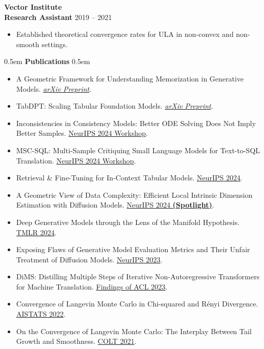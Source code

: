 \documentclass[11pt,a4paper]{article}
\newcommand{\cvsection}[1]{%
    \vspace{10pt}
    \noindent\hfill\kern0.5em
    {\Huge \textbf{\textcolor{maincolor}{#1}}}%
    \kern0.5em\hfill\vspace{8pt}
}
\begin{document}
{\Large \textbf{\textcolor{maincolor}{Vector Institute}}} \\
\textbf{Research Assistant} \hfill 2019 -- 2021
\begin{itemize}[noitemsep, topsep=4pt, leftmargin=1.5em, label=\textcolor{maincolorlight}{$\circ$}]
    \item Established theoretical convergence rates for ULA in non-convex and non-smooth settings.
\end{itemize}
\vspace{15pt}

\cvsection{Publications}
\begin{itemize}[noitemsep, topsep=4pt, leftmargin=0em, label=\textcolor{maincolorlight}{$\circ$}]
    \item A Geometric Framework for Understanding Memorization in Generative Models. {\textcolor{venuecolor}{\href{https://arxiv.org/abs/2411.00113}{\textit{arXiv Preprint}}}}.
    \item TabDPT: Scaling Tabular Foundation Models. {\textcolor{venuecolor}{\href{https://arxiv.org/abs/2410.18164}{\textit{arXiv Preprint}}}}.
    \item Inconsistencies in Consistency Models: Better ODE Solving Does Not Imply Better Samples. {\textcolor{venuecolor}{\href{https://openreview.net/forum?id=2p4ES8QPUi}{NeurIPS 2024 Workshop}}}.
    \item MSC-SQL: Multi-Sample Critiquing Small Language Models for Text-to-SQL Translation. {\textcolor{venuecolor}{\href{https://openreview.net/forum?id=RubZlwPv6D}{NeurIPS 2024 Workshop}}}.
    \item Retrieval \& Fine-Tuning for In-Context Tabular Models. {\textcolor{venuecolor}{\href{https://arxiv.org/abs/2406.05207}{NeurIPS 2024}}}.
    \item A Geometric View of Data Complexity: Efficient Local Intrinsic Dimension Estimation with Diffusion Models. {\textcolor{venuecolor}{\href{https://arxiv.org/abs/2406.03537}{NeurIPS 2024 \textbf{(Spotlight)}}}}.
    \item Deep Generative Models through the Lens of the Manifold Hypothesis. {\textcolor{venuecolor}{\href{https://openreview.net/forum?id=a90WpmSi0I}{TMLR 2024}}}.
    \item Exposing Flaws of Generative Model Evaluation Metrics and Their Unfair Treatment of Diffusion Models. {\textcolor{venuecolor}{\href{https://papers.nips.cc/paper_files/paper/2023/hash/0bc795afae289ed465a65a3b4b1f4eb7-Abstract-Conference.html}{NeurIPS 2023}}}.
    \item DiMS: Distilling Multiple Steps of Iterative Non-Autoregressive Transformers for Machine Translation. {\textcolor{venuecolor}{\href{https://aclanthology.org/2023.findings-acl.542}{Findings of ACL 2023}}}.
    \item Convergence of Langevin Monte Carlo in Chi-squared and R\'enyi Divergence. {\textcolor{venuecolor}{\href{https://proceedings.mlr.press/v151/erdogdu22a.html}{AISTATS 2022}}}.
    \item On the Convergence of Langevin Monte Carlo: The Interplay Between Tail Growth and Smoothness. {\textcolor{venuecolor}{\href{https://proceedings.mlr.press/v134/erdogdu21a.html}{COLT 2021}}}.
\end{itemize}
\end{document}
